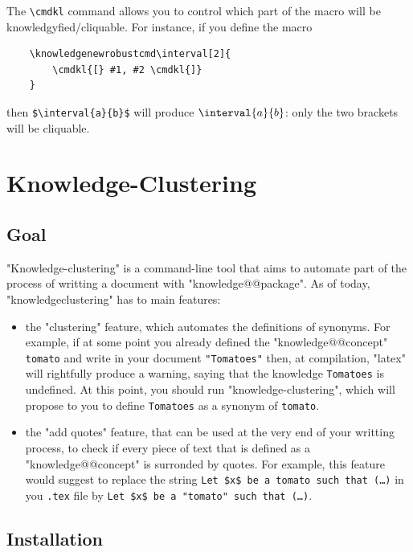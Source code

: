 \documentclass{article}
\begin{document}
The \verb|\cmdkl| command allows you to control which part of the macro will be
knowledgyfied/cliquable. For instance, if you define the macro
\AP{}
\begin{verbatim}
    \knowledgenewrobustcmd\interval[2]{
        \cmdkl{[} #1, #2 \cmdkl{]}
    }
\end{verbatim}
then \verb|$\interval{a}{b}$| will produce $\interval{a}{b}$: only the two
brackets will be cliquable.


\section{Knowledge-Clustering}

\subsection{Goal}

"Knowledge-clustering" is a command-line tool that aims to automate part of
the process of writting a document with "knowledge@@package".
As of today, "knowledge\-clustering" has to main features:
\begin{itemize}
    \item the "clustering" feature, which automates the definitions
    of synonyms. For example,  if at some point you already defined the 
    "knowledge@@concept" \verb|tomato| and write in your document
    \verb|"Tomatoes"|
    then, at compilation, "latex" will rightfully produce a warning,
    saying that the knowledge \verb|Tomatoes| is undefined.
    At this point, you should run "knowledge-clustering", which will propose to 
    you to define \verb|Tomatoes| as a synonym of \verb|tomato|.
    \item the "add quotes" feature, that can be used at the very end of your 
    writting process, to check if every piece of text that is defined as
    a "knowledge@@concept" is surronded by quotes. For example, this feature 
    would suggest to replace the string \verb|Let $x$ be a tomato such that (…)|
    in you \verb|.tex| file by \verb|Let $x$ be a "tomato" such that (…)|.
\end{itemize}

\subsection{Installation}
\end{document}
